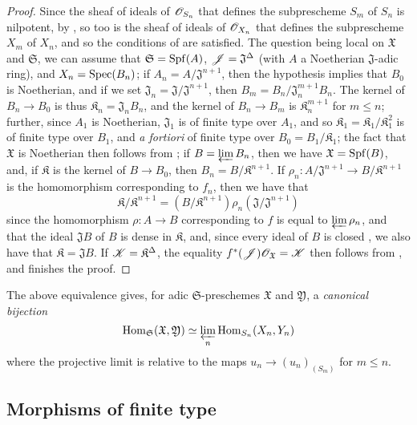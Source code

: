 \begin{proof}
Since the sheaf of ideals of $\mathscr{O}_{S_n}$ that defines the subprescheme $S_m$ of $S_n$ is nilpotent, by , so too is the sheaf of ideals of $\mathscr{O}_{X_n}$ that defines the subprescheme $X_m$ of $X_n$, and so the conditions of  are satisfied.
The question being local on $\mathfrak{X}$ and $\mathfrak{S}$, we can assume that $\mathfrak{S}=\operatorname{Spf}(A)$, $\mathscr{J}=\mathfrak{J}^\Delta$ (with $A$ a Noetherian $\mathfrak{J}$-adic ring), and $X_n=\operatorname{Spec}(B_n)$;
if $A_n=A/\mathfrak{J}^{n+1}$, then the hypothesis implies that $B_0$ is Noetherian, and if we set $\mathfrak{J}_n=\mathfrak{J}/\mathfrak{J}^{n+1}$, then $B_m=B_n/\mathfrak{J}_n^{m+1}B_n$.
The kernel of $B_n\to B_0$ is thus $\mathfrak{K}_n=\mathfrak{J}_nB_n$, and the kernel of $B_n\to B_m$ is $\mathfrak{K}_n^{m+1}$ for $m\leq n$;
further, since $A_1$ is Noetherian, $\mathfrak{J}_1$ is of finite type over $A_1$, and so $\mathfrak{K}_1=\mathfrak{K}_1/\mathfrak{K}_1^2$ is of finite type over $B_1$, and \emph{a fortiori} of finite type over $B_0=B_1/\mathfrak{K}_1$;
the fact that $\mathfrak{X}$ is Noetherian then follows from ;
if $B=\varprojlim B_n$, then we have $\mathfrak{X}=\operatorname{Spf}(B)$, and, if $\mathfrak{K}$ is the kernel of $B\to B_0$, then $B_n=B/\mathfrak{K}^{n+1}$.
If $\rho_n:A/\mathfrak{J}^{n+1}\to B/\mathfrak{K}^{n+1}$ is the homomorphism corresponding to $f_n$, then we have that
\[
    \mathfrak{K}/\mathfrak{K}^{n+1} = (B/\mathfrak{K}^{n+1})\rho_n(\mathfrak{J}/\mathfrak{J}^{n+1})
\]
since the homomorphism $\rho:A\to B$ corresponding to $f$ is equal to $\varprojlim\rho_n$, and that the ideal $\mathfrak{J}B$ of $B$ is dense in $\mathfrak{K}$, and, since every ideal of $B$ is closed , we also have that $\mathfrak{K}=\mathfrak{J}B$.
If $\mathscr{K}=\mathfrak{K}^\Delta$, the equality $f^*(\mathscr{J})\mathscr{O}_\mathfrak{X}=\mathscr{K}$ then follows from , and finishes the proof.
\end{proof}

\begin{env}[10.12.3.2]
\label{I.10.12.3.2}
The above equivalence gives, for adic $\mathfrak{S}$-preschemes $\mathfrak{X}$ and $\mathfrak{Y}$, a \emph{canonical bijection}
\[
  \operatorname{Hom}_\mathfrak{S}(\mathfrak{X},\mathfrak{Y})\simeq\varprojlim_n\operatorname{Hom}_{S_n}(X_n,Y_n)
\]
where the projective limit is relative to the maps $u_n\to(u_n)_{(S_m)}$ for $m\leq n$.
\end{env}

\subsection{Morphisms of finite type}
\label{subsection:I.10.13}

